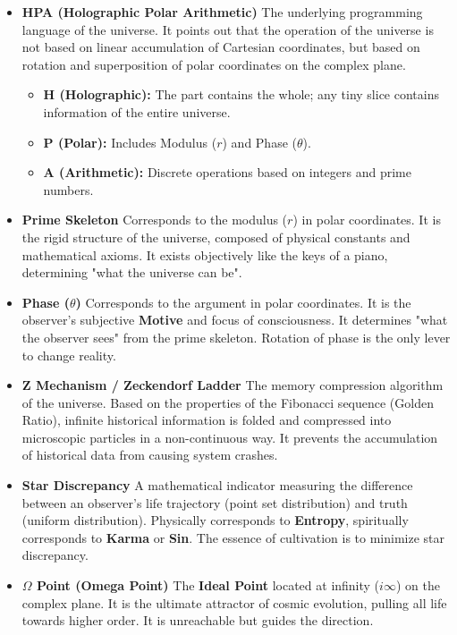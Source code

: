\begin{itemize}
\item \textbf{HPA (Holographic Polar Arithmetic)}
The underlying programming language of the universe. It points out that the operation of the universe is not based on linear accumulation of Cartesian coordinates, but based on rotation and superposition of polar coordinates on the complex plane.
\begin{itemize}
\item \textbf{H (Holographic):} The part contains the whole; any tiny slice contains information of the entire universe.
\item \textbf{P (Polar):} Includes Modulus ($r$) and Phase ($\theta$).
\item \textbf{A (Arithmetic):} Discrete operations based on integers and prime numbers.
\end{itemize}

\item \textbf{Prime Skeleton}
Corresponds to the modulus ($r$) in polar coordinates. It is the rigid structure of the universe, composed of physical constants and mathematical axioms. It exists objectively like the keys of a piano, determining "what the universe can be".

\item \textbf{Phase ($\theta$)}
Corresponds to the argument in polar coordinates. It is the observer's subjective \textbf{Motive} and focus of consciousness. It determines "what the observer sees" from the prime skeleton. Rotation of phase is the only lever to change reality.

\item \textbf{Z Mechanism / Zeckendorf Ladder}
The memory compression algorithm of the universe. Based on the properties of the Fibonacci sequence (Golden Ratio), infinite historical information is folded and compressed into microscopic particles in a non-continuous way. It prevents the accumulation of historical data from causing system crashes.

\item \textbf{Star Discrepancy}
A mathematical indicator measuring the difference between an observer's life trajectory (point set distribution) and truth (uniform distribution). Physically corresponds to \textbf{Entropy}, spiritually corresponds to \textbf{Karma} or \textbf{Sin}. The essence of cultivation is to minimize star discrepancy.

\item \textbf{$\Omega$ Point (Omega Point)}
The \textbf{Ideal Point} located at infinity ($i\infty$) on the complex plane. It is the ultimate attractor of cosmic evolution, pulling all life towards higher order. It is unreachable but guides the direction.
\end{itemize}

